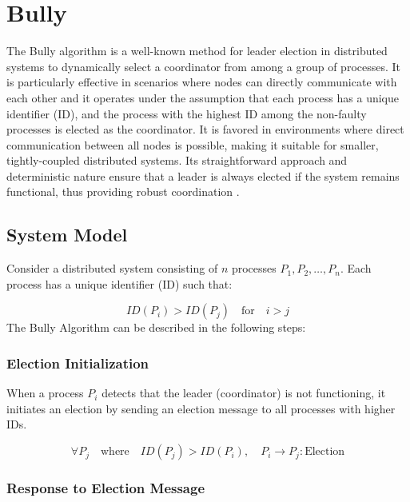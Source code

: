 \section{Bully}

The Bully algorithm is a well-known method for leader election in distributed systems to dynamically select a coordinator from among a group of processes.  It is particularly effective in scenarios where nodes can directly communicate with each other and it operates under the assumption that each process has a unique identifier (ID), and the process with the highest ID among the non-faulty processes is elected as the coordinator. It is favored in environments where direct communication between all nodes is possible, making it suitable for smaller, tightly-coupled distributed systems. Its straightforward approach and deterministic nature ensure that a leader is always elected if the system remains functional, thus providing robust coordination \cite{Ref9}.

\subsection{System Model}
Consider a distributed system consisting of \(n\) processes \(P_1, P_2, \ldots, P_n\). Each process has a unique identifier (ID) such that:

\[
ID(P_i) > ID(P_j) \quad \text{for} \quad i > j
\]
The Bully Algorithm can be described in the following steps:

\subsubsection{Election Initialization}

When a process \(P_i\) detects that the leader (coordinator) is not functioning, it initiates an election by sending an election message to all processes with higher IDs.

\begin{equation}
\forall P_j \quad \text{where} \quad ID(P_j) > ID(P_i), \quad P_i \rightarrow P_j: \text{Election}
\end{equation}

\subsubsection{Response to Election Message}

